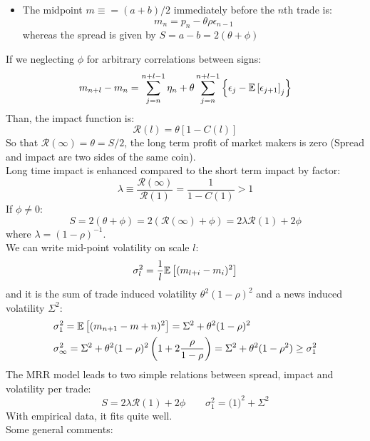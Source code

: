 \begin{mysetting}
	\begin{itemize}
		\item The midpoint $m \equiv = (a+b)/2$ immediately before the $n$th trade is:
		\[
		m_n = p_n - \theta \rho \epsilon_{n-1}
		\]
	whereas the spread is given by $S = a-b = 2(\theta + \phi)$
	\end{itemize}
\end{mysetting}
If we neglecting $\phi$ for arbitrary correlations between signs:
\[
m_{n+l} - m_n = \sum_{j=n}^{n+l-1} \eta_n + \theta \sum_{j =n }^{n + l-1} \left\{\epsilon_j - \mathbb{E}\left[\epsilon_{j+1}\right]_j\right\}
\]
Than, the impact function is:
\[
\mathcal{R}(l) = \theta[1 - C(l)]
\]
So that $\mathcal{R}(\infty) = \theta = S/2$, the long term profit of market makers is zero (Spread and impact are two sides of the same coin).\\
Long time impact is enhanced compared to the short term impact by factor:
\[
\lambda \equiv \frac{\mathcal{R} (\infty)}{\mathcal{R}(1)} = \frac{1}{1 -C(1)} > 1
\]
If $\phi \neq 0$:
\[
S = 2(\theta + \phi) = 2(\mathcal{R}(\infty) + \phi) = 2\lambda \mathcal{R}(1) + 2\phi
\]
where $\lambda = (1- \rho)^{-1}$.\\
We can write mid-point volatility on scale $l$:
\[
\sigma^2_l = \frac{1}{l} \mathbb{E}\left[(m_{l+i} - m_i)^2\right]
\]
and it is the sum of trade induced volatility $\theta^2(1-\rho)^2$ and a news induced volatility $\Sigma^2$:
\begin{align*}
	& \sigma_1^2 = \mathbb{E}\left[(m_{n+1} -m+n)^2\right] = \Sigma^2 + \theta^2(1-\rho)^2\\
	& \sigma^2_\infty = \Sigma^2 + \theta^2 (1-\rho)^2 \left(1 + 2 \frac{\rho}{1-\rho}\right) = \Sigma^2 + \theta^2(1 -\rho^2) \geq \sigma_1^2 
\end{align*}
The MRR model leads to two simple relations between spread, impact and volatility per trade:
\[
S = 2\lambda\mathcal{R}(1) + 2\phi \qquad \sigma_1^2 = \mathcal(1)^2 + \Sigma^2
\]
With empirical data, it fits quite well.\\
Some general comments:
